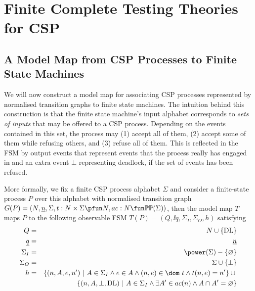 \section{Finite Complete Testing Theories for CSP}
\label{sec:finitecomplete}
\subsection{A Model Map from CSP Processes to Finite State Machines}
\label{sec:mmap}

We will now construct a model map for associating CSP processes represented by normalised transition graphs to finite state machines. The intuition behind this 
construction is that the finite state machine's input alphabet  corresponds to
{\it sets of inputs} that may be offered to a CSP process. Depending on the events 
contained in this set, the process may (1) accept all of them, (2) accept some of them while refusing others, and (3) refuse all of them. This is reflected in the FSM
by output events that represent events that the process really has engaged in and 
an extra event $\bot$ representing deadlock, if the set of events has been refused.

More formally, we fix a finite CSP process alphabet $\Sigma$ and consider a 
finite-state process 
$P$ over this alphabet with normalised transition graph 
$G(P)=( N, \ii n, \Sigma, t : N\times\Sigma \pfun N, ac : N \fun \mathbb{P}\mathbb{P}(\Sigma))$,
 then the model map $T$ maps $P$ to the following observable FSM $T(P) = (Q,\ii q, \Sigma_I,\Sigma_O,h)$ satisfying
\begin{eqnarray*}
Q & = & N\cup \{\DL\} 
\\
\ii q & = & \ii n
\\
\Sigma_I & = & \power(\Sigma) - \{ \varnothing \}
\\
\Sigma_O & = & \Sigma \cup \{ \bot\}
\\
h & = & \{ (n,A,e,n')~|~A\in \Sigma_I \wedge e\in A \wedge 
(n,e)\in \dom~t\wedge t(n,e) = n' \} \cup {}
\\ & & 
\{ (n,A,\bot,\DL)~|~A\in \Sigma_I   \wedge 
\exists A'\in ac(n) \wedge A\cap A' = \varnothing
  \}
\end{eqnarray*} 

